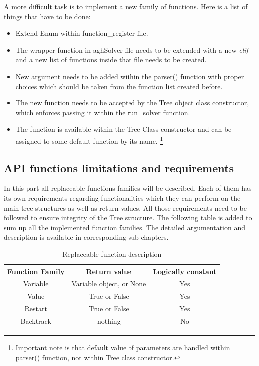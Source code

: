 \documentclass[12pt,english,pdflatex]{aghdpl}
\providecommand{\tabularnewline}{\\}
\begin{document}
A more difficult task is to implement a new family of functions. Here is a list of things that have to be done:
\begin{itemize}
\item Extend Enum within function\_register file. 
\item The wrapper function in aghSolver file needs to be extended
with a new \textit{elif} and a new list of functions inside that file needs to
be created.
\item New argument needs to be added within the parser() function with proper choices
which should be taken from the function list created before.
\item The new function needs to be accepted by the Tree object class constructor,
which enforces passing it within the run\_solver function. 
\item The function is available within the Tree Class constructor and can
be assigned to some default function by its name. \footnote{Important note
is that default value of parameters are handled within parser() function,
not within Tree class constructor.}
\end{itemize}

\subsection{API functions limitations and requirements}
\label{subsec:APIfuncts}
In this part all replaceable functions families will be described.
Each of them has its own requirements regarding functionalities which
they can perform on the  main tree structures as well as return values.
All those requirements need to be followed to ensure integrity of the 
Tree structure. The following table is added to sum up all the implemented function
families. The detailed argumentation and description is available in corresponding
sub-chapters.

\begin{table}[H]
\begin{centering}
\begin{tabular}{|c|c|c|}
\hline 
Function Family & Return value & Logically constant\tabularnewline
\hline 
\hline 
Variable & Variable object, or None & Yes\tabularnewline
\hline 
Value & True or False & Yes\tabularnewline
\hline 
Restart & True or False & Yes\tabularnewline
\hline 
Backtrack & nothing & No\tabularnewline
\hline 
\end{tabular}
\par\end{centering}
\caption{Replaceable function description}

\end{table}
\end{document}
